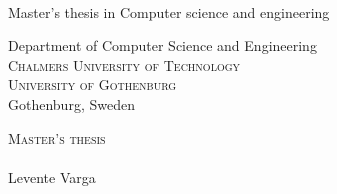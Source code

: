 
{ %


\begin{titlepage}
			
\addtolength{\voffset}{2cm}

\begin{figure}[H]
\centering
\vspace{1cm}	%
\end{figure}

\mbox{}
\vfill
\renewcommand{\familydefault}{\sfdefault} \normalfont %

\textbf{\Huge \multiLineTitle{0.2cm}} 
\\[0.5cm]



Master's thesis in Computer science and engineering \setlength{\parskip}{1cm}

{\Large \authorName} \setlength{\parskip}{2.9cm}

Department of Computer Science and Engineering \\
\textsc{Chalmers University of Technology} \\
\textsc{University of Gothenburg} \\
Gothenburg, Sweden \the\year

\renewcommand{\familydefault}{\rmdefault} \normalfont %
\end{titlepage}


\newpage
\restoregeometry
\thispagestyle{empty}
\mbox{}


\newpage
\thispagestyle{empty}
\begin{center}
	\textsc{\large Master's thesis \the\year}\\[4cm]		%
	\textbf{\Large \multiLineTitle{0.2cm}} \\[1cm]
	{\large Levente Varga}
	

\end{center}}
